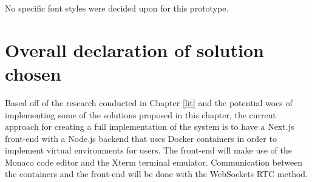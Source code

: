 No specific font styles were decided upon for this prototype.

\section{Overall declaration of solution chosen}

Based off of the research conducted in Chapter \ref{lit} and the potential woes of implementing some of the solutions proposed in this chapter, the current approach for creating a full implementation of the system is to have a Next.js front-end with a Node.js backend that uses Docker containers in order to implement virtual environments for users. The front-end will make use of the Monaco code editor and the Xterm terminal emulator. Communication between the containers and the front-end will be done with the WebSockets RTC method.


\pagebreak
